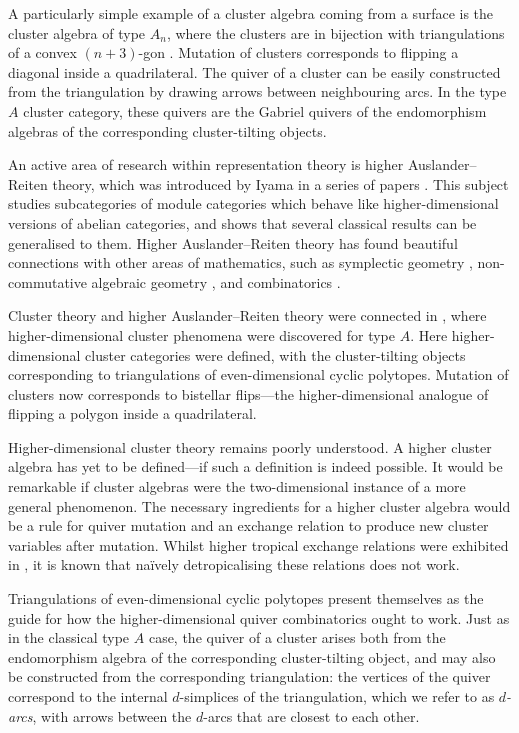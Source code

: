 \documentclass[ALCO,Unicode,published]{cedram}
\begin{document}
A particularly simple example of a cluster algebra coming from a surface is the cluster algebra of type $A_{n}$, where the clusters are in bijection with triangulations of a convex $(n + 3)$-gon \cite{fz1}. Mutation of clusters corresponds to flipping a diagonal inside a quadrilateral. The quiver of a cluster can be easily constructed from the triangulation by drawing arrows between neighbouring arcs. In the type $A$ cluster category, these quivers are the Gabriel quivers of the endomorphism algebras of the corresponding cluster-tilting objects.

An active area of research within representation theory is higher Auslander--Reiten theory, which was introduced by Iyama in a series of papers \cite{iy-high-ar,iy-aus,iy-clus}. This subject studies subcategories of module categories which behave like higher-dimensional versions of abelian categories, and shows that several classical results can be generalised to them. Higher Auslander--Reiten theory has found beautiful connections with other areas of mathematics, such as symplectic geometry \cite{djl}, non-commutative algebraic geometry \cite{himo}, and combinatorics \cite{ot,njw-hst}.

Cluster theory and higher Auslander--Reiten theory were connected in \cite{ot}, where higher-dimensional cluster phenomena were discovered for type $A$. Here higher-dimensional cluster categories were defined, with the cluster-tilting objects corresponding to triangulations of even-dimensional cyclic polytopes. Mutation of clusters now corresponds to bistellar flips---the higher-dimensional analogue of flipping a polygon inside a quadrilateral.

Higher-dimensional cluster theory remains poorly understood. A higher cluster algebra has yet to be defined---if such a definition is indeed possible. It would be remarkable if cluster algebras were the two-dimensional instance of a more general phenomenon. The necessary ingredients for a higher cluster algebra would be a rule for quiver mutation and an exchange relation to produce new cluster variables after mutation. Whilst higher tropical exchange relations were exhibited in \cite{ot}, it is known that na\"ively detropicalising these relations does not work.

Triangulations of even-dimensional cyclic polytopes present themselves as the guide for how the higher-dimensional quiver combinatorics ought to work. Just as in the classical type $A$ case, the quiver of a cluster arises both from the endomorphism algebra of the corresponding cluster-tilting object, and may also be constructed from the corresponding triangulation: the vertices of the quiver correspond to the internal $d$-simplices of the triangulation, which we refer to as \emph{$d$-arcs}, with arrows between the $d$-arcs that are closest to each other.
\end{document}
